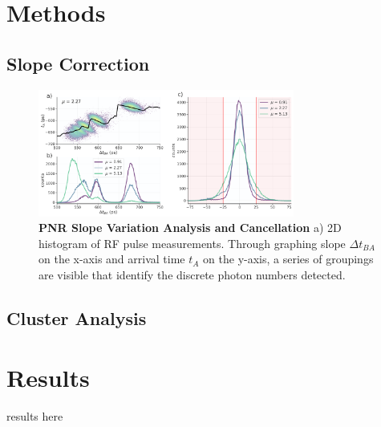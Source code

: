 \documentclass{optica-article}
\begin{document}
\hypertarget{methods}{%
\section{Methods}\label{methods}}

\hypertarget{slope-correction}{%
\subsection{Slope Correction}\label{slope-correction}}

\hypertarget{fig:slope-correction}{%
\begin{figure}
\centering
\includegraphics[width=0.75\textwidth]{./figs_03/slope_cancellation_light.pdf}
\caption[{PNR Slope Variation Analysis and Cancellation}]{\textbf{PNR Slope Variation Analysis and Cancellation} a) 2D histogram of RF pulse measurements. Through graphing slope \(\Delta t_{BA}\) on the x-axis and arrival time \(t_A\) on the y-axis, a series of groupings are visible that identify the discrete photon numbers detected.}
\label{fig:slope-correction}
\end{figure}
}

\hypertarget{cluster-analysis}{%
\subsection{Cluster Analysis}\label{cluster-analysis}}

\hypertarget{results}{%
\section{Results}\label{results}}

results here


\end{document}
